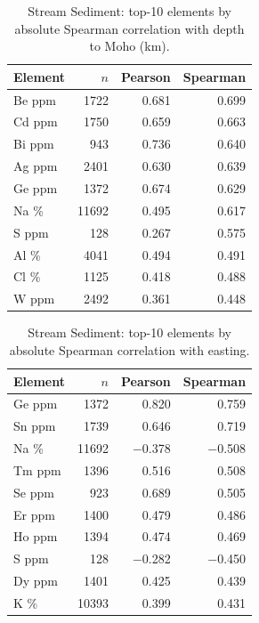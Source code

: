 \begin{table}[H]
  \centering
  \caption{Stream Sediment: top-10 elements by absolute Spearman correlation with depth to Moho (km).}
  \label{tab:ss-moho}
  \begin{tabular}{lrrr}
    \toprule
    Element & $n$ & Pearson & Spearman \\
    \midrule
    Be ppm & 1722  & 0.681 & 0.699 \\
    Cd ppm & 1750  & 0.659 & 0.663 \\
    Bi ppm & 943   & 0.736 & 0.640 \\
    Ag ppm & 2401  & 0.630 & 0.639 \\
    Ge ppm & 1372  & 0.674 & 0.629 \\
    Na \%  & 11692 & 0.495 & 0.617 \\
    S ppm  & 128   & 0.267 & 0.575 \\
    Al \%  & 4041  & 0.494 & 0.491 \\
    Cl \%  & 1125  & 0.418 & 0.488 \\
    W ppm  & 2492  & 0.361 & 0.448 \\
    \bottomrule
  \end{tabular}
\end{table}

\begin{table}[H]
  \centering
  \caption{Stream Sediment: top-10 elements by absolute Spearman correlation with easting.}
  \label{tab:ss-easting}
  \begin{tabular}{lrrr}
    \toprule
    Element & $n$ & Pearson & Spearman \\
    \midrule
    Ge ppm & 1372  & 0.820    & 0.759 \\
    Sn ppm & 1739  & 0.646    & 0.719 \\
    Na \%  & 11692 & $-$0.378 & $-$0.508 \\
    Tm ppm & 1396  & 0.516    & 0.508 \\
    Se ppm & 923   & 0.689    & 0.505 \\
    Er ppm & 1400  & 0.479    & 0.486 \\
    Ho ppm & 1394  & 0.474    & 0.469 \\
    S ppm  & 128   & $-$0.282 & $-$0.450 \\
    Dy ppm & 1401  & 0.425    & 0.439 \\
    K \%   & 10393 & 0.399    & 0.431 \\
    \bottomrule
  \end{tabular}
\end{table}

